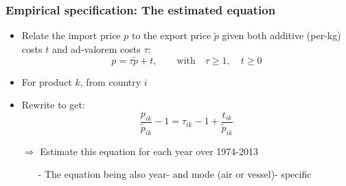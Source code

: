 \documentclass[10 pt,Helvetica, french]{beamer}
\begin{document}
\begin{frame}
\frametitle{Empirical specification: The estimated equation}
\begin{itemize}
\item Relate the import price $p$ to the export price $\widetilde{p}$ given both additive (per-kg) costs $t$ and ad-valorem costs $\tau$:
$$p = \tau \widetilde{p} + t, \qquad \text{with}\quad \tau \geq 1,\quad t \geq 0$$
\item For product $k$, from country $i$  \vspace{0.1cm}
\item Rewrite to get:
$$\frac{p_{ik}}{\widetilde{p}_{ik}} -1 = \tau_{ik} -1 +\frac{t_{ik}}{ \widetilde{p}_{ik}}$$
\item[$\Rightarrow$] Estimate this equation for each year over 1974-2013 \vspace{0.1cm}
\begin{itemize}
\item[-] The equation being also year- and mode (air or vessel)- specific
\end{itemize}

\end{itemize}
\end{frame}
\end{document}
